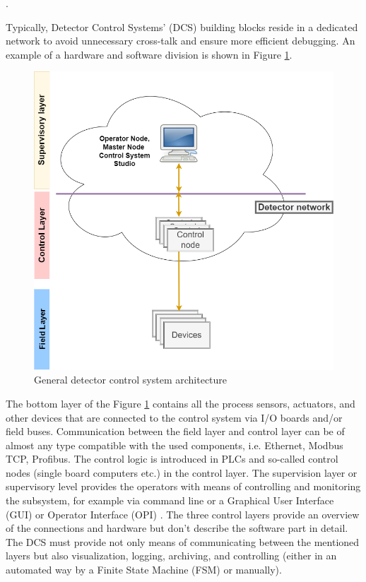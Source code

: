 
.%



 Typically, Detector Control Systems' (\gls{DCS}) building blocks reside in a dedicated network to avoid unnecessary cross-talk and ensure more efficient debugging. An example of a hardware and software division is shown in Figure \ref{fig_DCS_arch}.

 \begin{figure}[!h]
\centering
\includegraphics[width=0.5\columnwidth]{Chapter3/Controls/images/example.png}
\caption{General detector control system architecture}
\label{fig_DCS_arch}
\end{figure}

The bottom layer of the Figure \ref{fig_DCS_arch} contains all the process sensors, actuators, and other devices that are connected to the control system via I/O boards and/or field buses. Communication between the field layer and control layer can be of almost any type compatible with the used components, i.e. Ethernet, Modbus TCP, Profibus. The control logic is introduced in \gls{PLC}s and so-called control nodes (single board computers etc.) in the control layer. The supervision layer or supervisory level provides the operators with means of controlling and monitoring the subsystem, for example via command line or a Graphical User Interface (\gls{GUI}) or Operator Interface (\gls{OPI}) \cite{layers}. The three control layers provide an overview of the connections and hardware but don't describe the software part in detail. The \gls{DCS} must provide not only means of communicating between the mentioned layers but also visualization, logging, archiving, and controlling (either in an automated way by a Finite State Machine (\gls{FSM}) or manually). 
